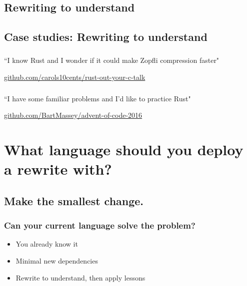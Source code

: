 \documentclass{beamer}
\begin{document}
\subsection{Rewriting to understand}

\begin{frame}[fragile]
\tableofcontents[currentsubsection]
\end{frame}

\subsection{Case studies: Rewriting to understand}

\begin{frame}[fragile]
\frametitle{\insertsubsectionhead}

``I know Rust and I wonder if it could make Zopfli compression faster"

\url{github.com/carols10cents/rust-out-your-c-talk}

\end{frame}

\begin{frame}[fragile]
\frametitle{\insertsubsectionhead}

``I have some familiar problems and I'd like to practice Rust"

\url{github.com/BartMassey/advent-of-code-2016}

\end{frame}

\section{What language should you deploy a rewrite with?}

\begin{frame}[fragile]
\tableofcontents [currentsection]
\end{frame}

\subsection{Make the smallest change.}

\begin{frame}[fragile]
\tableofcontents[currentsubsection]
\end{frame}


\begin{frame}[fragile]
\frametitle{Can your current language solve the problem?}
\begin{itemize}[<+(1)->]
\item You already know it
\item Minimal new dependencies
\item Rewrite to understand, then apply lessons
\end{itemize}
\end{frame}
\end{document}
